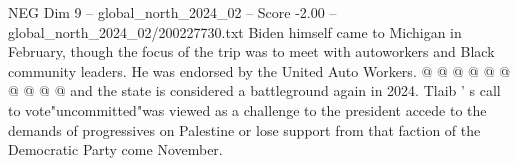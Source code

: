 \begin{textsample}{NEG Dim 9 – global\_north\_2024\_02 – Score -2.00 – global\_north\_2024\_02/200227730.txt}
Biden himself came to Michigan in February, though the focus of the trip was to meet with autoworkers and Black community leaders.
He was endorsed by the United Auto Workers. @ @ @ @ @ @ @ @ @ @ and the state is considered a battleground again in 2024.
Tlaib ' s call to vote"uncommitted"was viewed as a challenge to the president accede to the demands of progressives on Palestine or lose support from that faction of the Democratic Party come November.

\end{textsample}
